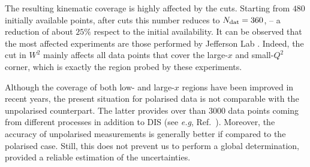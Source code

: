 The resulting kinematic coverage is highly affected by the cuts. Starting from $480$ initially available points, after cuts this number reduces to $N_{\textrm{dat}}=360$,  -- a reduction of about $25\%$ respect to the initial availability. It can be observed that the most affected experiments are those performed by Jefferson Lab \cite{Kramer:2002tt, JeffersonLabHallA:2004tea, CLAS:2014qtg}. Indeed, the cut in $W^2$ mainly affects all data points that cover the large-$x$ and small-$Q^2$ corner, which is exactly the region probed by these experiments.%

Although the coverage of both low- and large-$x$ regions have been improved in recent years, the present situation for polarised data is not comparable with the unpolarised counterpart. The latter provides over than $3000$ data points coming from different processes in addition to DIS (see \textit{e.g}, Ref.~\cite{Kassabov:2022pps}). Moreover, the accuracy of unpolarised measurements is generally better if compared to the polarised case. Still, this does not prevent us to perform a global determination, provided a reliable estimation of the uncertainties.%

